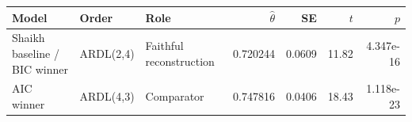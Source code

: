 \begin{tabular}{lllrrrr}
\toprule
Model & Order & Role & $\hat{\theta}$ & SE & $t$ & $p$ \\
\midrule
Shaikh baseline / BIC winner & ARDL(2,4) & Faithful reconstruction & 0.720244 & 0.0609 & 11.82 & 4.347e-16 \\
AIC winner & ARDL(4,3) & Comparator & 0.747816 & 0.0406 & 18.43 & 1.118e-23 \\
\bottomrule
\end{tabular}

